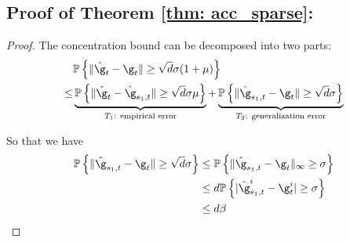     


\subsection{Proof of Theorem \ref{thm: acc_sparse}:}

\theoaccsparse*

\begin{proof}
The concentration bound can be decomposed into two parts:
\begin{align}\notag
    &\mathbb{P}\left\{ \|\tilde \g_t - \g_t\| \geq \sqrt{d}\sigma(1+\mu)\right\}\\\notag \leq 
    &\underbrace{ \mathbb{P}\left\{ \|\tilde \g_t - \hat \g_{s_1,t}\| \geq \sqrt{d}\sigma \mu\right\} }_{\text{$T_1$: empirical error}} + 
    \underbrace{\mathbb{P}\left\{ \|\hat \g_{s_1,t} - \g_t\| \geq \sqrt{d}\sigma \right\}}_{\text{$T_2$: generalization error}}
\end{align}

So that we have 
\begin{align} \notag
    \mathbb{P}\left\{ \|\hat \g_{s_1,t} - \g_t\| \geq  \sqrt{d}\sigma \right\} 
    &\leq \mathbb{P}\left\{ \|\hat \g_{s_1,t} - \g_t\|_\infty \geq  \sigma \right\} \\\notag
    &\leq d \mathbb{P}\left\{ |\hat \g_{s_1,t}^i - \g_t^i| \geq  \sigma \right\} \\\label{eq: gen2}
    &\leq d\beta 
\end{align}


\end{proof}
